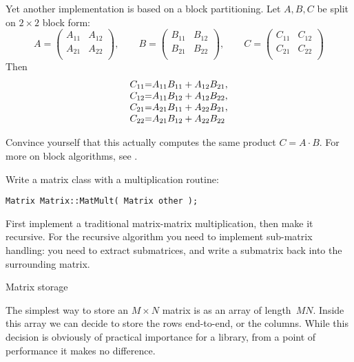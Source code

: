 Yet another implementation is based on a block partitioning. Let
$A,B,C$ be split on $2\times 2$ block form:
\[
A=
\begin{pmatrix}
  A_{11}&A_{12}\\ A_{21}&A_{22}\\
\end{pmatrix},\qquad
B=
\begin{pmatrix}
  B_{11}&B_{12}\\ B_{21}&B_{22}\\
\end{pmatrix},\qquad
C=
\begin{pmatrix}
  C_{11}&C_{12}\\ C_{21}&C_{22}\\
\end{pmatrix}
\]
Then
\begin{equation}
  \begin{array}{r@{=}l}
    C_{11}&A_{11}B_{11}+A_{12}B_{21},\\
    C_{12}&A_{11}B_{12}+A_{12}B_{22},\\
    C_{21}&A_{21}B_{11}+A_{22}B_{21},\\
    C_{22}&A_{21}B_{12}+A_{22}B_{22}\\
  \end{array}
  \label{eq:22matprod}
\end{equation}

Convince yourself that this actually computes the same product $C=A\cdot B$.
For more on block algorithms, see .

\begin{exercise}
  Write a matrix class with a multiplication routine:
\begin{lstlisting}
Matrix Matrix::MatMult( Matrix other );
\end{lstlisting}
First implement a traditional matrix-matrix multiplication,
then make it recursive.
For the recursive algorithm you need to implement
sub-matrix handling: you need to extract submatrices,
and write a submatrix back into the surrounding matrix.
\end{exercise}

 {Matrix storage}

The simplest way to store an $M\times N$ matrix is as an array of
length~$MN$.
Inside this array we can decide to store the rows
end-to-end, or the columns.
While this decision is obviously of practical importance
for a library, from a point of performance it makes no difference.

